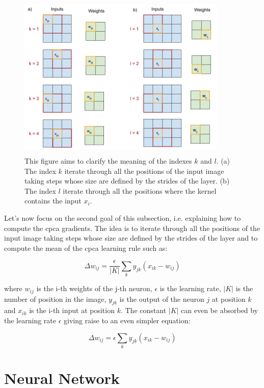 \documentclass[11pt]{report}
\begin{document}
\begin{figure}[h]
\centering
\includegraphics[width=10cm, height=8cm]{k_weights_vs_inputs}
\caption{This figure aims to clarify the meaning of the indexes $k$ and $l$. (a) The index $k$ iterate through all the positions of the input image taking steps whose size are defined by the strides of the layer. (b) The index $l$ iterate through all the positions where the kernel contains the input $x_i$.}
\label{k_weights_vs_inputs}
\end{figure}

\noindent Let's now focus on the second goal of this subsection, i.e. explaining how to compute the \acrshort{cpca} gradients. The idea is to iterate through all the positions of the input image taking steps whose size are defined by the strides of the layer and to compute the mean of the \acrshort{cpca} learning rule such as:

\begin{equation}
\Delta w_{ij} = \frac{\epsilon}{|K|} \sum_{k} y_{jk}(x_{ik} - w_{ij})
\end{equation}

\noindent where $w_{ij}$ is the i-th weights of the j-th neuron, $\epsilon$ is the learning rate, $|K|$ is the number of position in the image, $y_{jk}$ is the output of the neuron $j$ at position $k$ and $x_{ik}$ is the i-th input at position $k$. The constant $|K|$ can even be absorbed by the learning rate $\epsilon$ giving raise to an even simpler equation:

\begin{equation}
\Delta w_{ij} = \epsilon \sum_{k} y_{jk}(x_{ik} - w_{ij})
\end{equation}

\section{Neural Network}
\end{document}
